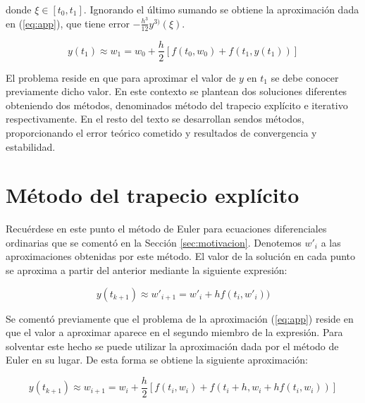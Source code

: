 \documentclass{article}
\theoremstyle{theorem-style}  %
\theoremstyle{definition}
\theoremstyle{example-style}
\begin{document}
	donde $\xi \in [t_0, t_1]$. Ignorando el último sumando se obtiene la aproximación dada en (\ref{eq:app}), que tiene error $- \frac{h^3}{12}y^{3)}(\xi)$.

	\begin{equation} \label{eq:app}
		y(t_1) \approx w_1 = w_0 + \frac{h}{2} \left[f(t_0,w_0) + f(t_1, y(t_1))\right]
	\end{equation}

	El problema reside en que para aproximar el valor de $y$ en $t_1$ se debe conocer previamente dicho valor. En este contexto se plantean dos soluciones diferentes obteniendo dos métodos, denominados método del trapecio explícito e iterativo respectivamente. En el resto del texto se desarrollan sendos métodos, proporcionando el error teórico cometido y resultados de convergencia y estabilidad.
	

\section{Método del trapecio explícito}	 \label{sec:trapecio-explicito}
		
		Recuérdese en este punto el método de Euler para ecuaciones diferenciales ordinarias que se comentó en la Sección \ref{sec:motivacion}. Denotemos $w'_i$ a las aproximaciones obtenidas por este método. El valor de la solución en cada punto se aproxima a partir del anterior mediante la siguiente expresión:
		
		\begin{equation*} \label{eq:euler}
			y(t_{k+1}) \approx w'_{i+1} = w'_i + h f(t_i,w'_i))
		\end{equation*}

		Se comentó previamente que el problema de la aproximación (\ref{eq:app}) reside en que el valor a aproximar aparece en el segundo miembro de la expresión. Para solventar este hecho se puede utilizar la aproximación dada por el método de Euler en su lugar. De esta forma se obtiene la siguiente aproximación:

		\begin{equation} \label{eq:app-exp}
			y(t_{k+1}) \approx w_{i+1} = w_i + \frac{h}{2} \left[f(t_i,w_i) + f(t_{i}+h, w_i + h f(t_i,w_i))\right]
		\end{equation}
\end{document}
